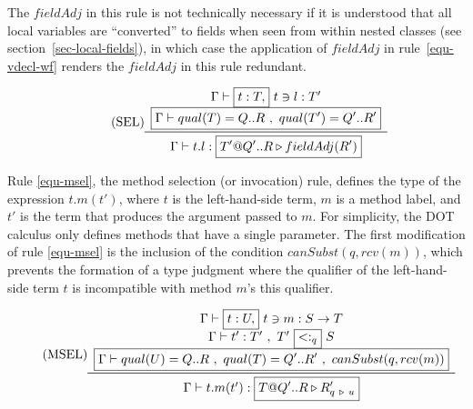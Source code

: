 The $fieldAdj$ in this rule is not technically necessary if it is understood that
all local variables are ``converted'' to fields when seen from within nested classes
(see section~\ref{sec-local-fields}), in which case the application of $fieldAdj$
in rule~\ref{equ-vdecl-wf} renders the $fieldAdj$ in this rule redundant.

\begin{equation*}\tag{SEL}\label{equ-sel}
\begin{array}{c}
\Gamma \vdash \boxed{t : T,}\ t \ni l : T' \\
\boxed{\Gamma \vdash qual(T)=Q..R\ , \ qual(T')=Q'..R'} \\
\midrule
\Gamma \vdash t.l : \boxed{T'@Q'..R \triangleright fieldAdj(R')} \\
\end{array}
\end{equation*}

\vspace{0.4cm}

Rule \ref{equ-msel}, the method selection (or invocation) rule, defines the type of
the expression $t.m(t')$, where $t$ is the left-hand-side term,
$m$ is a method label, and $t'$ is the term that produces the argument
passed to $m$. For simplicity, the DOT calculus only defines methods that
have a single parameter.
The first modification of rule \ref{equ-msel} is the inclusion of the
condition $canSubst(q, rcv(m))$, which prevents the formation of a type
judgment where the qualifier of the left-hand-side term $t$ is incompatible with
method $m$'s {\cd this} qualifier.

\begin{equation*}\tag{MSEL}\label{equ-msel}
\begin{array}{c}
\Gamma \vdash \boxed{t: U,}\ t \ni m: S \rightarrow T \\
\Gamma \vdash t': T'\ ,\ T'\ \boxed{<:_q}\ S \\
\boxed{\Gamma \vdash qual(U)=Q..R\ ,\ qual(T)=Q'..R'\ ,\ canSubst(q, rcv(m))} \\
\midrule
\Gamma \vdash t.m(t'): \boxed{T@Q'..R \triangleright R'  _{q\ \triangleright\ u}} \\
\end{array}
\end{equation*}

\vspace{0.4cm}

